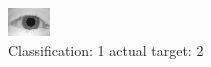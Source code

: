 \begin{figure}[h!]
\begin{center}
\includegraphics[width=0.60\columnwidth]{figures/ID973_class_1_target_2.png}
\end{center}
\caption{ Classification: 1 actual target: 2}
\label{fig:ID973_class_1_target_2}
\end{figure}
